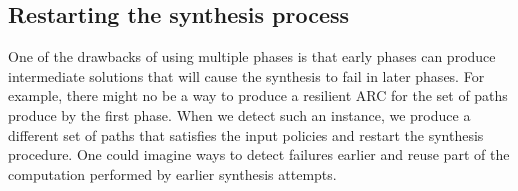 \subsection{Restarting the synthesis process} \label{sec:restart}
One of the drawbacks of using multiple phases is that
early phases can produce intermediate solutions that will cause the synthesis to fail in  later phases. 
For example, there might no be a way to produce a resilient ARC for  the set of paths produce by the first phase. 
When we detect such an instance, we produce a different set of paths that satisfies the input policies
and restart the synthesis procedure.
One could imagine ways to detect failures earlier and reuse part of the computation performed by earlier synthesis
attempts. %
